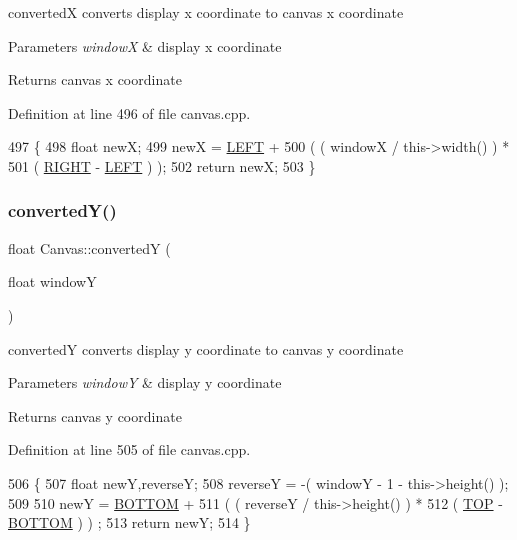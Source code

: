 convertedX converts display x coordinate to canvas x coordinate 


\begin{DoxyParams}{Parameters}
{\em windowX} & display x coordinate \\
\hline
\end{DoxyParams}
\begin{DoxyReturn}{Returns}
canvas x coordinate 
\end{DoxyReturn}


Definition at line 496 of file canvas.\+cpp.


\begin{DoxyCode}
497 \{
498     \textcolor{keywordtype}{float} newX;
499     newX = \hyperlink{class_canvas_a7da74603fc4232dfe00be701878d048b}{LEFT} +
500             ( ( windowX / this->width() ) *
501               ( \hyperlink{class_canvas_ab618bb921e1c0ee7c394fe3a83b17271}{RIGHT} - \hyperlink{class_canvas_a7da74603fc4232dfe00be701878d048b}{LEFT} ) );
502     \textcolor{keywordflow}{return} newX;
503 \}
\end{DoxyCode}
\mbox{\label{class_canvas_a12cbc7e3a2cb3bbb6278052d49a90313}} 
\subsubsection{\texorpdfstring{converted\+Y()}{convertedY()}}
{\footnotesize\ttfamily float Canvas\+::convertedY (\begin{DoxyParamCaption}\item[{float}]{windowY }\end{DoxyParamCaption})\hspace{0.3cm}{\ttfamily [private]}}



convertedY converts display y coordinate to canvas y coordinate 


\begin{DoxyParams}{Parameters}
{\em windowY} & display y coordinate \\
\hline
\end{DoxyParams}
\begin{DoxyReturn}{Returns}
canvas y coordinate 
\end{DoxyReturn}


Definition at line 505 of file canvas.\+cpp.


\begin{DoxyCode}
506 \{
507     \textcolor{keywordtype}{float} newY,reverseY;
508     reverseY = -( windowY - 1 - this->height() );
509 
510     newY = \hyperlink{class_canvas_a0630c650c5daea2db5a01ce6c0954457}{BOTTOM} +
511             ( ( reverseY / this->height() ) *
512               ( \hyperlink{class_canvas_a3d5a1c71903689cf817cd92ae7a2ebc9}{TOP} - \hyperlink{class_canvas_a0630c650c5daea2db5a01ce6c0954457}{BOTTOM} ) ) ;
513     \textcolor{keywordflow}{return} newY;
514 \}
\end{DoxyCode}
\mbox{\label{class_canvas_ab1413076d90539aea7ac3a06b065afe2}} 
